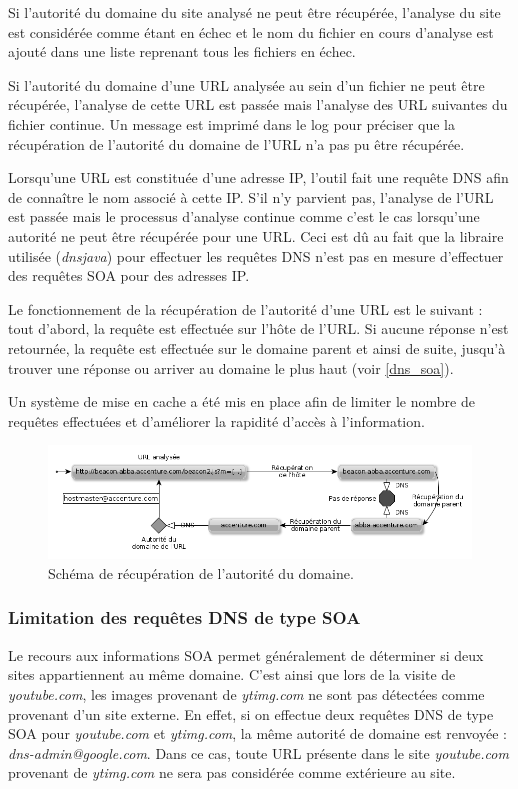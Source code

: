 Si l'autorité du domaine du site analysé ne peut être récupérée, l'analyse du site est considérée comme étant en échec et le nom du fichier en cours d'analyse est ajouté dans une liste reprenant tous les fichiers en échec.

Si l'autorité du domaine d'une URL analysée au sein d'un fichier ne peut être récupérée, l'analyse de cette URL est passée mais l'analyse des URL suivantes du fichier continue. Un message est imprimé dans le log pour préciser que la récupération de l'autorité du domaine de l'URL n'a pas pu être récupérée.

Lorsqu'une URL est constituée d'une adresse IP, l'outil fait une requête DNS afin de connaître le nom associé à cette IP. S'il n'y parvient pas, l'analyse de l'URL est passée mais le processus d'analyse continue comme c'est le cas lorsqu'une autorité ne peut être récupérée pour une URL. Ceci est dû au fait que la libraire utilisée (\textit{dnsjava}) pour effectuer les requêtes DNS n'est pas en mesure d'effectuer des requêtes SOA pour des adresses IP.

Le fonctionnement de la récupération de l'autorité d'une URL est le suivant : tout d'abord, la requête est effectuée sur l'hôte de l'URL. Si aucune réponse n'est retournée, la requête est effectuée sur le domaine parent et ainsi de suite, jusqu'à trouver une réponse ou arriver au domaine le plus haut (voir \autoref{dns_soa}).

Un système de mise en cache a été mis en place afin de limiter le nombre de requêtes effectuées et d'améliorer la rapidité d'accès à l'information.

\begin{figure}[h]
	\centering
	\includegraphics[scale=0.7]{figures/DNS_SOA_NB.png}
	\caption{\label{dns_soa}Schéma de récupération de l'autorité du domaine.}
\end{figure}

\subsubsection{Limitation des requêtes DNS de type SOA}
Le recours aux informations SOA permet généralement de déterminer si deux sites appartiennent au même domaine. C'est ainsi que lors de la visite de \textit{youtube.com}, les images provenant de \textit{ytimg.com} ne sont pas détectées comme provenant d'un site externe. %
En effet, si on effectue deux requêtes DNS de type SOA pour \textit{youtube.com} et \textit{ytimg.com}, la même autorité de domaine est renvoyée : \textit{dns-admin@google.com}.
Dans ce cas, toute URL présente dans le site \textit{youtube.com} provenant de \textit{ytimg.com} ne sera pas considérée comme extérieure au site.
\newline

